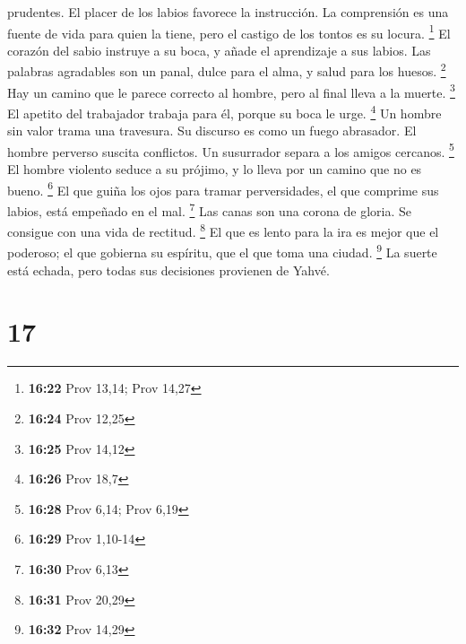 prudentes. El placer de los labios favorece la instrucción.
 La comprensión es una fuente de vida para quien la
tiene, pero el castigo de los tontos es su locura. \footnote{\textbf{16:22}
  Prov 13,14; Prov 14,27}  El corazón del sabio instruye
a su boca, y añade el aprendizaje a sus labios.  Las
palabras agradables son un panal, dulce para el alma, y salud para los
huesos. \footnote{\textbf{16:24} Prov 12,25}  Hay un
camino que le parece correcto al hombre, pero al final lleva a la
muerte. \footnote{\textbf{16:25} Prov 14,12}  El apetito
del trabajador trabaja para él, porque su boca le urge. \footnote{\textbf{16:26}
  Prov 18,7}  Un hombre sin valor trama una travesura. Su
discurso es como un fuego abrasador.  El hombre perverso
suscita conflictos. Un susurrador separa a los amigos cercanos.
\footnote{\textbf{16:28} Prov 6,14; Prov 6,19}  El hombre
violento seduce a su prójimo, y lo lleva por un camino que no es bueno.
\footnote{\textbf{16:29} Prov 1,10-14}  El que guiña los
ojos para tramar perversidades, el que comprime sus labios, está
empeñado en el mal. \footnote{\textbf{16:30} Prov 6,13} 
Las canas son una corona de gloria. Se consigue con una vida de
rectitud. \footnote{\textbf{16:31} Prov 20,29}  El que es
lento para la ira es mejor que el poderoso; el que gobierna su espíritu,
que el que toma una ciudad. \footnote{\textbf{16:32} Prov 14,29}
 La suerte está echada, pero todas sus decisiones
provienen de Yahvé.

\hypertarget{section-16}{%
\section{17}\label{section-16}}

